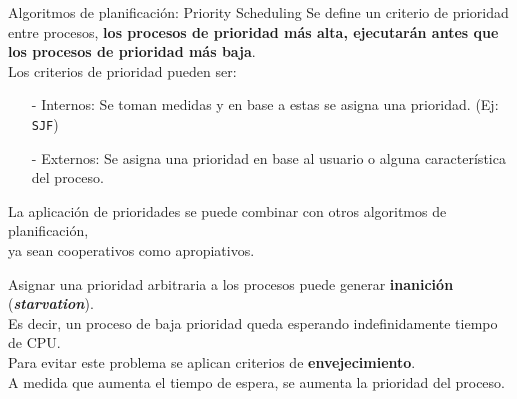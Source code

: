 \documentclass[aspectratio=169]{beamer}
\begin{document}
\begin{frame}[t]{\large Algoritmos de planificación: \Large Priority Scheduling}
    \small
    Se define un criterio de prioridad entre procesos, \textcolor{verdeuca}{\textbf{los procesos de prioridad más alta, ejecutarán antes que los procesos de prioridad más baja}}.\\
    \pause
    \bigskip
    Los criterios de prioridad pueden ser:
    \begin{itemize}
     \item[-] \textcolor{naranjauca}{Internos}: Se toman medidas y en base a estas se asigna una prioridad. (Ej: \texttt{SJF})
     \item[-] \textcolor{naranjauca}{Externos}: Se asigna una prioridad en base al usuario o alguna característica del proceso.
    \end{itemize}
    \pause
    \bigskip
    \begin{tcolorbox}[size=small,width=\textwidth,sharp corners,title={}]
    La aplicación de prioridades se puede combinar con otros algoritmos de planificación,\\ ya sean cooperativos como apropiativos.
    \end{tcolorbox}
    \pause
    \bigskip
    Asignar una prioridad arbitraria a los procesos puede generar \textbf{inanición} (\textbf{\emph{starvation}}).\\
    \textcolor{verdeuca}{Es decir, un proceso de baja prioridad queda esperando indefinidamente tiempo de CPU.}\\
    \medskip
    \pause
    Para evitar este problema se aplican criterios de \textbf{envejecimiento}.\\
    \textcolor{verdeuca}{A medida que aumenta el tiempo de espera, se aumenta la prioridad del proceso.}
\end{frame}
\end{document}
